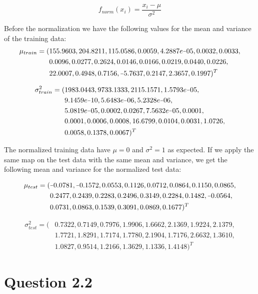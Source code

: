 \documentclass[11pt,a4paper]{article}
\newcommand*{\matminus}{%
  \leavevmode
  \hphantom{0}%
  \llap{%
    \settowidth{\dimen0 }{$0$}%
    \resizebox{\dimen0 }{\height}{$-$}%
  }%
}
\begin{document}
$$ f_{norm}(x_i) = \frac{x_i - \mu}{\sigma^2} $$

Before the normalization we have the following values for the mean and variance of the training data:
\begin{align}
\mu_{train} =  (&155.9603,204.8211,115.0586,0.0059,4.2887e\matminus05,0.0032,0.0033, \\
                &0.0096,0.0277,0.2624,0.0146,0.0166,0.0219,0.0440,0.0226, \\
                &22.0007,0.4948,0.7156,\matminus5.7637,0.2147,2.3657,0.1997)^T
\end{align}

\begin{align}
\sigma^2_{train} = (&1983.0443,9733.1333,2115.1571,1.5793e\matminus05,\\
                    &9.1459e\matminus10,5.6483e\matminus06,5.2328e\matminus06, \\
                    &5.0819e\matminus05,0.0002,0.0267,7.5632e\matminus05,0.0001, \\
                    &0.0001,0.0006,0.0008,16.6799,0.0104,0.0031,1.0726, \\
                    &0.0058,0.1378,0.0067)^T
\end{align}


The normalized training data have $\mu = 0$ and $\sigma^2 = 1$ as expected. If we apply
the same map on the test data with the same mean and variance, we get the following mean
and variance for the normalized test data:

\begin{align} 
\mu_{test} = (&\matminus0.0781,\matminus0.1572,0.0553,0.1126,0.0712,0.0864,0.1150,0.0865, \\
              &0.2477,0.2439,0.2283,0.2496,0.3149,0.2284,0.1482,\matminus0.0564, \\
              &0.0731,0.0863,0.1539,0.3091,0.0869,0.1677)^T
\end{align}

\begin{align}
  \sigma^2_{test} = (&0.7322,0.7149,0.7976,1.9906,1.6662,2.1369,1.9224,2.1379, \\
                     &1.7721,1.8291,1.7174,1.7780,2.1904,1.7176,2.6632,1.3610, \\
                     &1.0827,0.9514,1.2166,1.3629,1.1336,1.4148)^T
\end{align}



\section{Question 2.2}
\end{document}
